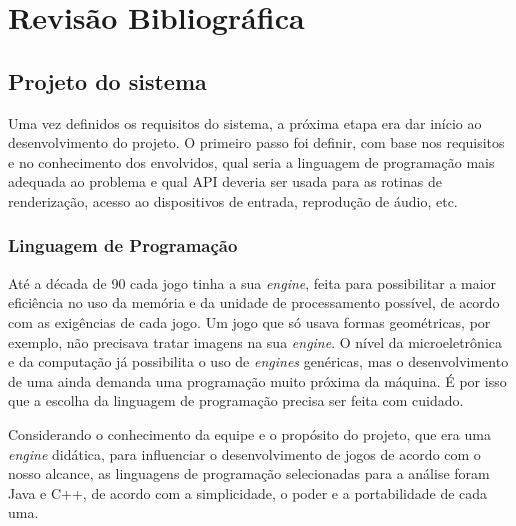 \chapter{Revisão Bibliográfica}
\label{cap:revisao_bibliografica}
%
%
\section{Projeto do sistema}
%
Uma vez definidos os requisitos do sistema, a próxima etapa era dar início ao desenvolvimento do projeto. O primeiro passo foi definir, com base nos requisitos e no conhecimento dos envolvidos, qual seria a linguagem de programação mais adequada ao problema e qual API deveria ser usada para as rotinas de renderização, acesso ao dispositivos de entrada, reprodução de áudio, etc.
%
%
\subsection{Linguagem de Programação}
\label{linguagem}
%
Até a década de 90 cada jogo tinha a sua \textit{engine}, feita para possibilitar a maior eficiência no uso da memória e da unidade de processamento possível, de acordo com as exigências de cada jogo. Um jogo que só usava formas geométricas, por exemplo, não precisava tratar imagens na sua \textit{engine}. O nível da microeletrônica e da computação já possibilita o uso de \textit{engines} genéricas, mas o desenvolvimento de uma ainda demanda uma programação muito próxima da máquina. É por isso que a escolha da linguagem de programação precisa ser feita com cuidado. 
\par 
Considerando o conhecimento da equipe e o propósito do projeto, que era uma \textit{engine} didática, para influenciar o desenvolvimento de jogos de acordo com o nosso alcance, as linguagens de programação selecionadas para a análise foram Java e C++, de acordo com a simplicidade, o poder e a portabilidade de cada uma.
%
